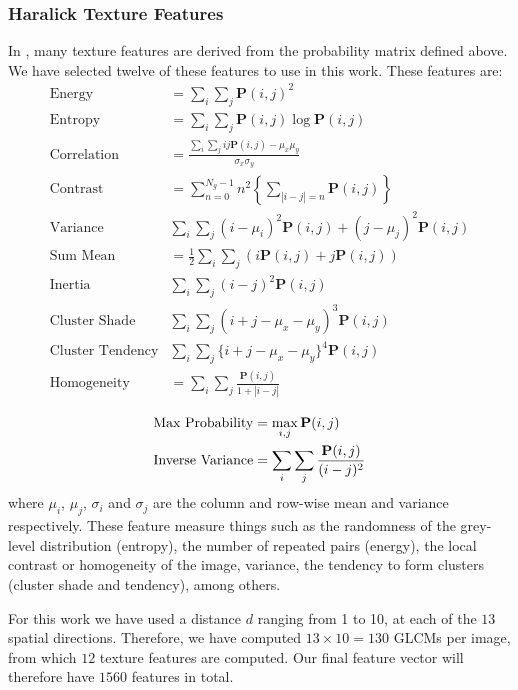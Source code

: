 \subsubsection{Haralick Texture Features}
In \cite{Haralick73,Haralick1992a}, many texture features are derived from the probability matrix defined above. We have selected twelve of these features to use in this work. These features are: 
\begin{align}
\text{Energy} & = \sum\limits_i\sum\limits_j \mathbf{P}(i,j)^2\\ 
\text{Entropy} & = \sum\limits_i\sum\limits_j \mathbf{P}(i,j) \log \mathbf{P}(i,j)\\
\text{Correlation} & = \frac{\sum_i\sum_j ij\mathbf{P}(i,j) - \mu_x\mu_y}{\sigma_x\sigma_y}\\
\text{Contrast} & = \sum\limits_{n=0}^{N_g-1} n^2 \left\lbrace\sum\limits_{|i-j|=n}\mathbf{P}(i,j)\right\rbrace  \\
\text{Variance} & \sum\limits_i\sum\limits_j (i-\mu_i)^2 \mathbf{P}(i,j)+ (j-\mu_j)^2\mathbf{P}(i,j)\\
\text{Sum Mean} & = \frac{1}{2} \sum\limits_i\sum\limits_j(i\mathbf{P}(i,j)+j\mathbf{P}(i,j))\\
\text{Inertia} & \sum\limits_i\sum\limits_j (i-j)^2\mathbf{P}(i,j)\\
\text{Cluster Shade} & \sum\limits_i\sum\limits_j (i+j-\mu_x-\mu_y)^3 \mathbf{P}(i,j)\\
\text{Cluster Tendency} & \sum\limits_i\sum\limits_j \{ i+j-\mu_x-\mu_y\}^4 \mathbf{P}(i,j)\\
\text{Homogeneity} & = \sum\limits_i\sum\limits_j \frac{\mathbf{P}(i,j)}{1+|i-j|}\\
\end{align}
\begin{align}
\text{Max Probability} & = \max_{i,j} \mathbf{P}(i,j)\\
\text{Inverse Variance} & = \sum\limits_i\sum\limits_j {\mathbf{P}(i,j) \over (i-j)^2}
\end{align}
where $\mu_i$, $\mu_j$, $\sigma_i$ and $\sigma_j$ are the column and row-wise mean and variance respectively. These feature measure things such as the randomness of the grey-level distribution (entropy), the number of repeated pairs (energy), the local contrast or homogeneity of the image, variance, the tendency to form clusters (cluster shade and tendency), among others. 

For this work we have used a distance $d$ ranging from 1 to 10, at each of the $13$ spatial directions. Therefore, we have computed $13\times10=130$ \acp{GLCM} per image, from which $12$ texture features are computed. Our final feature vector will therefore have $1560$ features in total. 

